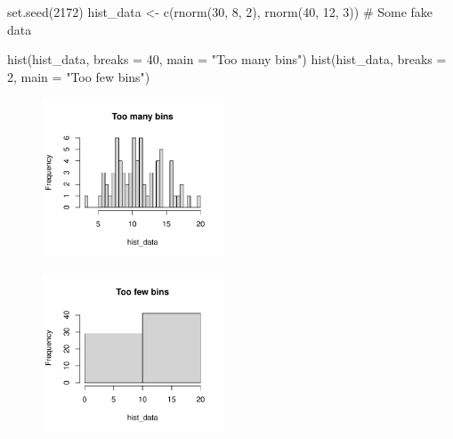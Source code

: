 \documentclass[
  letterpaper,
  DIV=11,
  numbers=noendperiod]{scrreprt}
\newenvironment{Shaded}{\begin{snugshade}}{\end{snugshade}}
\newcommand{\AttributeTok}[1]{\textcolor[rgb]{0.40,0.45,0.13}{#1}}
\newcommand{\CommentTok}[1]{\textcolor[rgb]{0.37,0.37,0.37}{#1}}
\newcommand{\DecValTok}[1]{\textcolor[rgb]{0.68,0.00,0.00}{#1}}
\newcommand{\FunctionTok}[1]{\textcolor[rgb]{0.28,0.35,0.67}{#1}}
\newcommand{\NormalTok}[1]{\textcolor[rgb]{0.00,0.23,0.31}{#1}}
\newcommand{\OtherTok}[1]{\textcolor[rgb]{0.00,0.23,0.31}{#1}}
\newcommand{\StringTok}[1]{\textcolor[rgb]{0.13,0.47,0.30}{#1}}
\theoremstyle{remark}
\begin{document}
\begin{Shaded}
\begin{Highlighting}[]
\FunctionTok{set.seed}\NormalTok{(}\DecValTok{2172}\NormalTok{)}
\NormalTok{hist\_data }\OtherTok{\textless{}{-}} \FunctionTok{c}\NormalTok{(}\FunctionTok{rnorm}\NormalTok{(}\DecValTok{30}\NormalTok{, }\DecValTok{8}\NormalTok{, }\DecValTok{2}\NormalTok{), }\FunctionTok{rnorm}\NormalTok{(}\DecValTok{40}\NormalTok{, }\DecValTok{12}\NormalTok{, }\DecValTok{3}\NormalTok{))  }\CommentTok{\# Some fake data}

\FunctionTok{hist}\NormalTok{(hist\_data, }\AttributeTok{breaks =} \DecValTok{40}\NormalTok{, }\AttributeTok{main =} \StringTok{"Too many bins"}\NormalTok{)}
\FunctionTok{hist}\NormalTok{(hist\_data, }\AttributeTok{breaks =} \DecValTok{2}\NormalTok{,  }\AttributeTok{main =} \StringTok{"Too few bins"}\NormalTok{)}
\end{Highlighting}
\end{Shaded}

\begin{figure}[H]

{\centering \includegraphics[width=0.48\textwidth,height=\textheight]{sections/L02-dataviz_files/figure-pdf/hist-bins-1.pdf}

}

\end{figure}

\begin{figure}[H]

{\centering \includegraphics[width=0.48\textwidth,height=\textheight]{sections/L02-dataviz_files/figure-pdf/hist-bins-2.pdf}

}

\end{figure}
\end{document}
